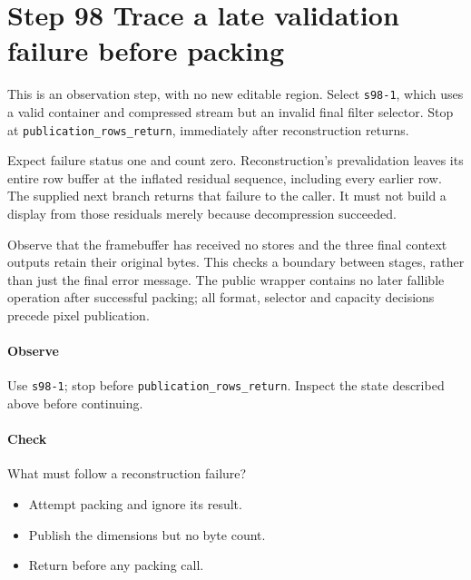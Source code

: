 \section{Step 98 Trace a late validation failure before packing}
This is an observation step, with no new editable region. Select \texttt{s98-1}, which uses a valid container and compressed stream but an invalid final filter selector. Stop at \texttt{publication\_rows\_return}, immediately after reconstruction returns.

Expect failure status one and count zero. Reconstruction’s prevalidation leaves its entire row buffer at the inflated residual sequence, including every earlier row. The supplied next branch returns that failure to the caller. It must not build a display from those residuals merely because decompression succeeded.

Observe that the framebuffer has received no stores and the three final context outputs retain their original bytes. This checks a boundary between stages, rather than just the final error message. The public wrapper contains no later fallible operation after successful packing; all format, selector and capacity decisions precede pixel publication.

\paragraph{Observe} Use \texttt{s98-1}; stop before \texttt{publication\_rows\_return}. Inspect the state described above before continuing.

\paragraph{Check} What must follow a reconstruction failure?
\begin{itemize}
  \item[A.] Attempt packing and ignore its result.
  \item[B.] Publish the dimensions but no byte count.
  \item[C.] Return before any packing call.
\end{itemize}
